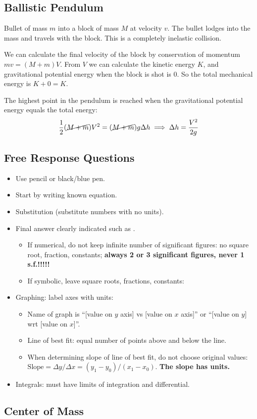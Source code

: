 \documentclass{article}
\newcommand{\remark}[2]{\begin{tcolorbox}[title={#1},colback=black!5!white,colframe=black!75!black,parbox=false] #2 \end{tcolorbox}}
\begin{document}
\subsection{Ballistic Pendulum}

Bullet of mass $m$ into a block of mass $M$ at velocity $v$. The bullet lodges into the mass and travels with the block. This is a completely inelastic collision.

We can calculate the final velocity of the block by conservation of momentum $mv=(M+m)V$. From $V$ we can calculate the kinetic energy $K$, and gravitational potential energy when the block is shot is $0$. So the total mechanical energy is $K+0=K$.

The highest point in the pendulum is reached when the gravitational potential energy equals the total energy:
\begin{equation*}
	\frac12(\cancel{M+m})V^2=(\cancel{M+m})g\Delta h
	\implies \Delta h=\frac{V^2}{2g}
\end{equation*}

\subsection*{Free Response Questions}

\remark{Free response}{\begin{itemize}
	\item Use pencil or black/blue pen.
	\item Start by writing known equation.
	\item Substitution (substitute numbers with no units).
	\item Final answer clearly indicated such as \boxed{\text{boxed}}.
		\begin{itemize}
			\item If numerical, do not keep infinite number of significant figures: no square root, fraction, constants; \textbf{always 2 or 3 significant figures, never 1 s.f.!!!!!}
			\item If symbolic, leave square roots, fractions, constants:
		\end{itemize}
	\item Graphing: label axes with units:
		\begin{itemize}
			\item Name of graph is ``[value on $y$ axis] vs [value on $x$ axis]'' or ``[value on $y$] wrt [value on $x$]''.
			\item Line of best fit: equal number of points above and below the line.
			\item When determining slope of line of best fit, do not choose original values: $\text{Slope}=\Delta y/\Delta x=(y_1-y_0)/(x_1-x_0)$. \textbf{The slope has units.}
		\end{itemize}
	\item Integrals: must have limits of integration and differential.
\end{itemize}}

\subsection{Center of Mass}
\end{document}
